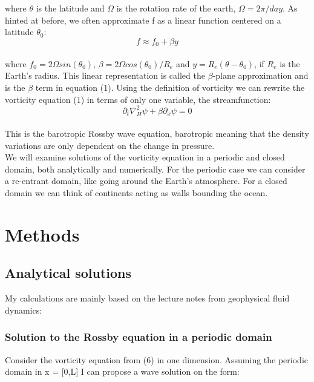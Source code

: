 where $\theta$ is the latitude and $\Omega$ is the rotation rate of the earth, $\Omega = 2\pi/day$. As hinted at before, we often approximate f as a linear function centered on a latitude $\theta_0$:\\

\begin{equation}
f\approx f_0 + \beta y
\end{equation}\\

where $f_0 = 2\Omega sin(\theta_0)$, $\beta = 2\Omega cos(\theta_0)/R_e$ and $y = R_e(\theta - \theta_0)$, if $R_e$ is the Earth's radius. This linear representation is called the $\beta$-plane approximation and is the $\beta$ term in equation (1). Using the definition of vorticity we can rewrite the vorticity equation (1) in terms of only one variable, the streamfunction:\\

\begin{equation}
\partial_t\nabla^2_H\psi + \beta\partial_x\psi = 0
\end{equation}\\

This is the barotropic Rossby wave equation, barotropic meaning that the density variations are only dependent on the change in pressure.\\

We will examine solutions of the vorticity equation in a periodic and closed domain, both analytically and numerically. For the periodic case we can consider a re-entrant domain, like going around the Earth's atmosphere. For a closed domain we can think of continents acting as walls bounding the ocean.

 



\section{Methods}
\subsection{Analytical solutions}
My calculations are mainly based on the lecture notes from geophysical fluid dynamics: \cite{geofludyn}\\

\subsubsection{Solution to the Rossby equation in a periodic domain}
Consider the vorticity equation from (6) in one dimension. Assuming the periodic domain in x = [0,L] I can propose a wave solution on the form:\\


